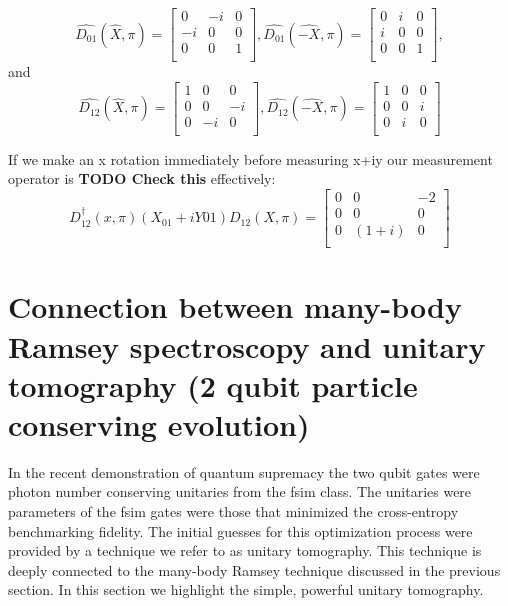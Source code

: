 {\begin{equation}
    \hat{D_{01}}(\hat{X}, \pi)=
    \begin{bmatrix}
        0  & -i & 0 \\
        -i & 0 & 0 \\
        0  & 0 & 1 \\
    \end{bmatrix},
    \hat{D_{01}}(\hat{-X}, \pi)=
    \begin{bmatrix}
        0  & i & 0 \\
        i & 0 & 0 \\
        0  & 0 & 1 \\
    \end{bmatrix},
\end{equation}
and
\begin{equation}
    \hat{D_{12}}(\hat{X}, \pi)=
    \begin{bmatrix}
        1 & 0 & 0 \\
        0 & 0 & -i \\
        0 & -i & 0 \\
    \end{bmatrix},
    \hat{D_{12}}(\hat{-X}, \pi)=
    \begin{bmatrix}
        1 & 0 & 0 \\
        0 & 0 & i \\
        0 & i & 0 \\
    \end{bmatrix}
\end{equation}

If we make an x rotation immediately before measuring x+iy our measurement operator is \textbf{TODO Check this} effectively:
\begin{equation}
    D_{12}^{\dagger}(x,\pi)(X_{01}+iY{01})D_{12}(X,\pi) =
    \begin{bmatrix}
        0 & 0 & -2 \\
        0 & 0 & 0 \\
        0 & (1+i) & 0 \\
    \end{bmatrix}
\end{equation}
} %

\section{ Connection between many-body Ramsey spectroscopy and unitary tomography (2 qubit particle conserving evolution)}
In the recent demonstration of quantum supremacy \cite{Arute2019} the two qubit gates were photon number conserving unitaries from the fsim class.
The unitaries were parameters of the fsim gates were those that minimized the cross-entropy benchmarking fidelity.
The initial guesses for this optimization process were provided by a technique we refer to as unitary tomography.
This technique is deeply connected to the many-body Ramsey technique discussed in the previous section.
In this section we highlight the simple, powerful unitary tomography.

